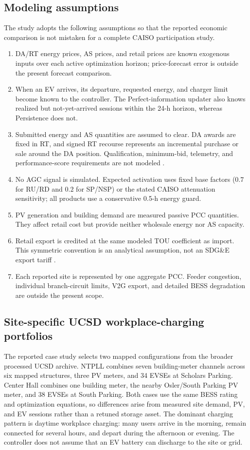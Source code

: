 \documentclass[final,5p,times]{elsarticle}
\begin{document}
\subsection{Modeling assumptions}
The study adopts the following assumptions so that the reported economic
comparison is not mistaken for a complete CAISO participation study.
\begin{enumerate}
  \item DA/RT energy prices, AS prices, and retail prices are known exogenous
  inputs over each active optimization horizon; price-forecast error is outside
  the present forecast comparison.
  \item When an EV arrives, its departure, requested energy, and charger limit
  become known to the controller. The Perfect-information updater also
  knows realized but not-yet-arrived sessions within the 24-h horizon, whereas
  Persistence does not.
  \item Submitted energy and AS quantities are assumed to clear. DA awards are
  fixed in RT, and signed RT recourse represents an incremental purchase or
  sale around the DA position. Qualification, minimum-bid, telemetry, and
  performance-score requirements are not modeled \cite{caisoAncillary2026} \cite{caisoDER2026}.
  \item No AGC signal is simulated. Expected activation uses fixed base factors
  ($0.7$ for RU/RD and $0.2$ for SP/NSP) or the stated CAISO attenuation
  sensitivity; all products use a conservative 0.5-h energy guard.
  \item PV generation and building demand are measured passive PCC quantities.
  They affect retail cost but provide neither wholesale energy nor AS capacity.
  \item Retail export is credited at the same modeled TOU coefficient as import.
  This symmetric convention is an analytical assumption, not an SDG\&E export
  tariff \cite{sdgeLargeCommercial2025}.
  \item Each reported site is represented by one aggregate PCC. Feeder congestion,
  individual branch-circuit limits, V2G export, and detailed BESS degradation are
  outside the present scope.
\end{enumerate}

\subsection{Site-specific UCSD workplace-charging portfolios}
The reported case study selects two mapped configurations from the broader processed UCSD archive. NTPLL combines seven building-meter channels across six mapped structures, three PV meters, and 34 EVSEs at Scholars Parking. Center Hall combines one building meter, the nearby Osler/South Parking PV meter, and 38 EVSEs at South Parking. Both cases use the same BESS rating and optimization equations, so differences arise from measured site demand, PV, and EV sessions rather than a retuned storage asset. The dominant charging pattern is daytime workplace charging: many users arrive in the morning, remain connected for several hours, and depart during the afternoon or evening. The controller does not assume that an EV battery can discharge to the site or grid.
\end{document}
